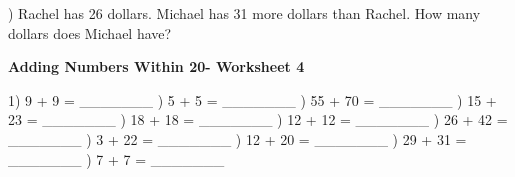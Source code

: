 \documentclass{article}%
\begin{document}
\newline%
\newline%
) Rachel has 26 dollars. Michael has 31 more dollars than Rachel. How many dollars does Michael have?%
\newline%
\newline%
\newline%
\pagebreak%
\large%
\begin{center}%
\textbf{Adding Numbers Within 20- Worksheet 4}%
\newline%
\newline%
\newline%
\end{center} \normalsize%
1) 9 + 9 = \_\_\_\_\_\_\_%
\newline%
\newline%
) 5 + 5 = \_\_\_\_\_\_\_%
\newline%
\newline%
) 55 + 70 = \_\_\_\_\_\_\_%
\newline%
\newline%
) 15 + 23 = \_\_\_\_\_\_\_%
\newline%
\newline%
) 18 + 18 = \_\_\_\_\_\_\_%
\newline%
\newline%
) 12 + 12 = \_\_\_\_\_\_\_%
\newline%
\newline%
) 26 + 42 = \_\_\_\_\_\_\_%
\newline%
\newline%
) 3 + 22 = \_\_\_\_\_\_\_%
\newline%
\newline%
) 12 + 20 = \_\_\_\_\_\_\_%
\newline%
\newline%
) 29 + 31 = \_\_\_\_\_\_\_%
\newline%
\newline%
) 7 + 7 = \_\_\_\_\_\_\_%
\newline%
\end{document}
